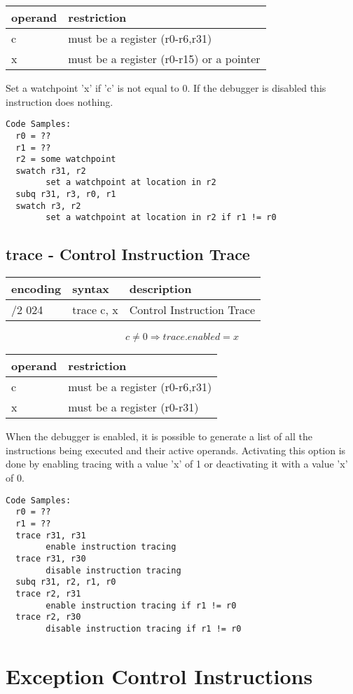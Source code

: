 \documentclass[letterpaper,10pt,openright,twoside,onecolumn]{book}
\begin{document}
  \flushleft
  \begin{tabular}{|l|l|}
   \hline
    operand & restriction \\
   \hline
    c & must be a register (r0-r6,r31) \\
    x & must be a register (r0-r15) or a pointer \\
   \hline
  \end{tabular}

  Set a watchpoint 'x' if 'c' is not equal to 0.  If the debugger is disabled this
  instruction does nothing.

  \begin{verbatim}
Code Samples:
  r0 = ??
  r1 = ??
  r2 = some watchpoint
  swatch r31, r2
        set a watchpoint at location in r2
  subq r31, r3, r0, r1
  swatch r3, r2 
        set a watchpoint at location in r2 if r1 != r0
  \end{verbatim}
\newpage\subsection{trace - Control Instruction Trace}
  \begin{tabular}{|l|l|l|}
   \hline
    encoding & syntax & description \\
   \hline
    /2 024 & trace c, x & Control Instruction Trace \\
   \hline
  \end{tabular}

  \begin{displaymath} c \neq 0 \Rightarrow trace.enabled = x\end{displaymath}

  \flushleft
  \begin{tabular}{|l|l|}
   \hline
    operand & restriction \\
   \hline
    c & must be a register (r0-r6,r31) \\
    x & must be a register (r0-r31) \\
   \hline
  \end{tabular}

  When the debugger is enabled, it is possible to generate a list of all the instructions
  being executed and their active operands.  Activating this option is done by enabling
  tracing with a value 'x' of 1 or deactivating it with a value 'x' of 0.

  \begin{verbatim}
Code Samples:
  r0 = ??
  r1 = ??
  trace r31, r31
        enable instruction tracing
  trace r31, r30
        disable instruction tracing
  subq r31, r2, r1, r0
  trace r2, r31
        enable instruction tracing if r1 != r0
  trace r2, r30
        disable instruction tracing if r1 != r0
  \end{verbatim}
\clearpage\section{Exception Control Instructions}
\end{document}
